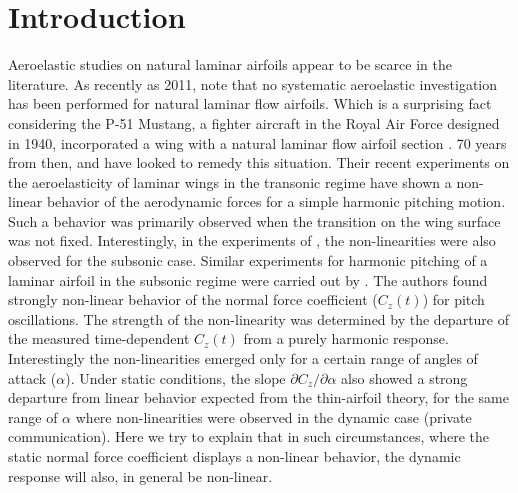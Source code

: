 %
%
%
%


%

\section{Introduction}
Aeroelastic studies on natural laminar airfoils appear to be scarce in the literature. As recently as 2011, \cite{mai11} note that no systematic aeroelastic investigation has been performed for natural laminar flow airfoils. Which is a surprising fact considering the P-51 Mustang, a fighter aircraft in the Royal Air Force designed in 1940, incorporated a wing with a natural laminar flow airfoil section \citep{green08}. 70 years from then, \cite{mai11} and \cite{hebler13} have looked to remedy this situation. Their recent experiments on the aeroelasticity of laminar wings in the transonic regime have shown a non-linear behavior of the aerodynamic forces for a simple harmonic pitching motion. Such a behavior was primarily observed when the transition on the wing surface was not fixed. Interestingly, in the experiments of \cite{mai11}, the non-linearities were also observed for the subsonic case. Similar experiments for harmonic pitching of a laminar airfoil in the subsonic regime were carried out by \cite{lokattthesis}. The authors found strongly non-linear behavior of the normal force coefficient ($C_{z}(t)$) for pitch oscillations. The strength of the non-linearity was determined by the departure of the measured time-dependent $C_{z}(t)$ from a purely harmonic response. Interestingly the non-linearities emerged only for a certain range of angles of attack ($\alpha$). Under static conditions, the slope $\partial C_{z}/\partial\alpha$ also showed a strong departure from linear behavior expected from the thin-airfoil theory, for the same range of $\alpha$ where non-linearities were observed in the dynamic case (private communication). Here we try to explain that in such circumstances, where the static normal force coefficient displays a non-linear behavior, the dynamic response will also, in general be non-linear.

